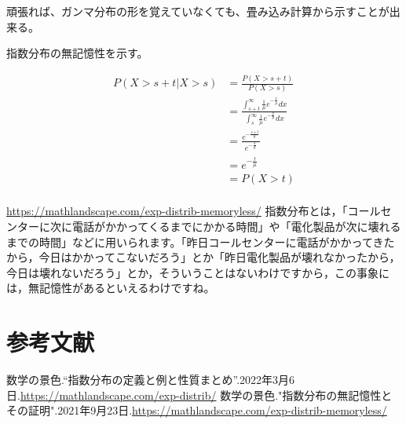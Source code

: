 \documentclass[a4paper, 10pt, dvipdfmx]{jlreq}
\begin{document}
頑張れば、ガンマ分布の形を覚えていなくても、畳み込み計算から示すことが出来る。

指数分布の無記憶性を示す。

\begin{align*}
  P(X>s+t|X>s) & =\frac{P(X>s+t)}{P(X>s)}                                                                                         \\
               & =\frac{\int_{s+t}^{\infty}\frac{1}{\mu}e^{-\frac{x}{\mu}}dx}{\int_{s}^{\infty}\frac{1}{\mu}e^{-\frac{x}{\mu}}dx} \\
               & =\frac{e^{-\frac{s+t}{\mu}}}{e^{-\frac{s}{\mu}}}                                                                 \\
               & =e^{-\frac{t}{\mu}}                                                                                              \\
               & =P(X>t)                                                                                                          \\
\end{align*}

\begin{itembox}[l]{\href{指数分布の無記憶性とその証明}{https://mathlandscape.com/exp-distrib-memoryless/}}
  指数分布とは，「コールセンターに次に電話がかかってくるまでにかかる時間」や「電化製品が次に壊れるまでの時間」などに用いられます。「昨日コールセンターに電話がかかってきたから，今日はかかってこないだろう」とか「昨日電化製品が壊れなかったから，今日は壊れないだろう」とか，そういうことはないわけですから，この事象には，無記憶性があるといえるわけですね。
\end{itembox}

\section{参考文献}
\begin{thebibliography}{9}
  数学の景色.“指数分布の定義と例と性質まとめ”.2022年3月6日.\url{https://mathlandscape.com/exp-distrib/}
  数学の景色."指数分布の無記憶性とその証明".2021年9月23日.\url{https://mathlandscape.com/exp-distrib-memoryless/}
\end{thebibliography}
\end{document}
